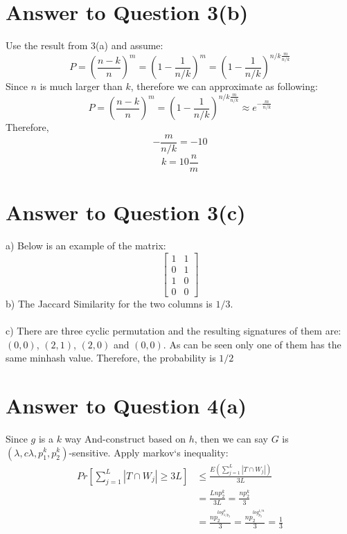 \documentclass[11pt]{article}
\begin{document}
\section*{Answer to Question 3(b)}
Use the result from 3(a) and assume:
\begin{equation*}
    P = (\frac{n-k}{n})^m = (1 - \frac{1}{n/k})^m = (1 - \frac{1}{n/k})^{n/k\frac{m}{n/k}}
\end{equation*}
Since $n$ is much larger than $k$, therefore we can approximate as following:
\begin{equation*}
    P = (\frac{n-k}{n})^m = (1 - \frac{1}{n/k})^{n/k\frac{m}{n/k}} \approx e^{-\frac{m}{n/k}}
\end{equation*}
Therefore,
\begin{equation*}
    -\frac{m}{n/k} = -10
\end{equation*}
\begin{equation}
    k = 10\frac{n}{m}
\end{equation}

\pagebreak[4]
\section*{Answer to Question 3(c)}
a) Below is an example of the matrix:
\begin{equation*}
\begin{bmatrix}
    1 & 1\\
    0 & 1\\
    1 & 0\\
    0 & 0
\end{bmatrix}
\end{equation*}
b) The Jaccard Similarity for the two columns is $1/3$.\\
\\
c) There are three cyclic permutation and the resulting signatures of them are:
$(0, 0)$, $(2, 1)$, $(2, 0)$ and $(0, 0)$. As can be seen only one of them has the same minhash value.
Therefore, the probability is $1/2$

\pagebreak[4]
\section*{Answer to Question 4(a)}
Since $g$ is a $k$ way And-construct based on $h$,
then we can say $G$ is $(\lambda,c\lambda, p_1^k, p_2^k)$-sensitive.
Apply markov`s inequality:
\begin{equation}
\begin{aligned}
Pr[\sum_{j=1}^L|T\cap W_j|\geq3L] & \leq \frac{E(\sum_{j=1}^L|T\cap W_j|)}{3L}\\
& = \frac{Lnp_2^k}{3L} = \frac{np_2^k}{3}\\
&  = \frac{np_2^{log_{1/p_2}^n}}{3} = \frac{np_2^{log_{p_2}^{1/n}}}{3} = \frac{1}{3}
\end{aligned}
\end{equation}
\end{document}
